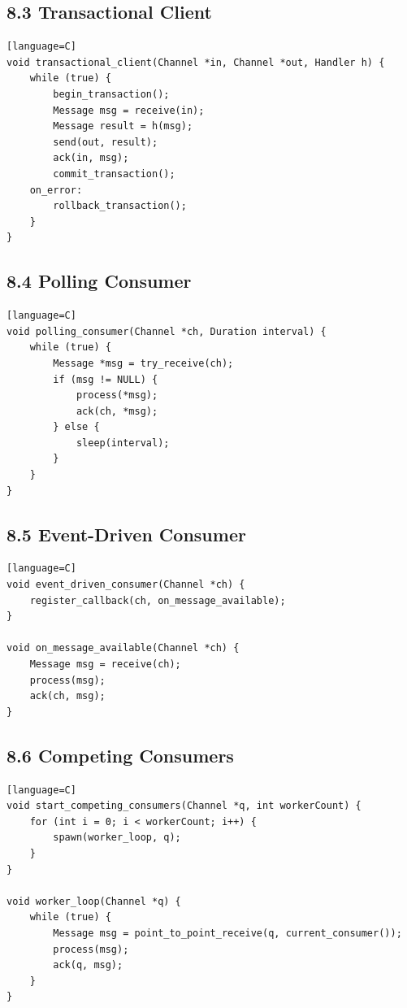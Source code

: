 \documentclass[11pt]{article}
\begin{document}
\subsection{8.3 Transactional Client}\label{transactional-client}

\begin{verbatim}[language=C]
void transactional_client(Channel *in, Channel *out, Handler h) {
    while (true) {
        begin_transaction();
        Message msg = receive(in);
        Message result = h(msg);
        send(out, result);
        ack(in, msg);
        commit_transaction();
    on_error:
        rollback_transaction();
    }
}
\end{verbatim}

\subsection{8.4 Polling Consumer}\label{polling-consumer}

\begin{verbatim}[language=C]
void polling_consumer(Channel *ch, Duration interval) {
    while (true) {
        Message *msg = try_receive(ch);
        if (msg != NULL) {
            process(*msg);
            ack(ch, *msg);
        } else {
            sleep(interval);
        }
    }
}
\end{verbatim}

\subsection{8.5 Event-Driven Consumer}\label{event-driven-consumer}

\begin{verbatim}[language=C]
void event_driven_consumer(Channel *ch) {
    register_callback(ch, on_message_available);
}

void on_message_available(Channel *ch) {
    Message msg = receive(ch);
    process(msg);
    ack(ch, msg);
}
\end{verbatim}

\subsection{8.6 Competing Consumers}\label{competing-consumers}

\begin{verbatim}[language=C]
void start_competing_consumers(Channel *q, int workerCount) {
    for (int i = 0; i < workerCount; i++) {
        spawn(worker_loop, q);
    }
}

void worker_loop(Channel *q) {
    while (true) {
        Message msg = point_to_point_receive(q, current_consumer());
        process(msg);
        ack(q, msg);
    }
}
\end{verbatim}
\end{document}
